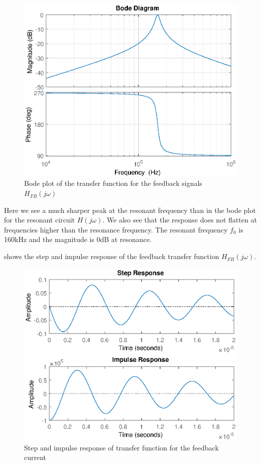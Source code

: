 \begin{figure}[H]
    \centering
    \includegraphics[width=\textwidth]{img/FeedBackBode.eps}
    \caption{Bode plot of the transfer function for the feedback signals $H_{FB}(j\omega)$}
    \label{fig:fb_bode}
\end{figure}

Here we see a much sharper peak at the resonant frequency than in the bode plot for the resonant circuit $H(j\omega)$. We also see that the response does not flatten at frequencies higher than the resonance frequency. The resonant frequency $f_0$ is 160kHz and the magnitude is 0dB at resonance.


 shows the step and impulse response of the feedback transfer function $H_{FB}(j\omega)$.

\begin{figure}[H]
    \centering
    \includegraphics[width=\textwidth]{img/FeedBackResponse.eps}
    \caption{Step and impulse response of transfer function for the feedback current}
    \label{fig:fb_step}
\end{figure}

